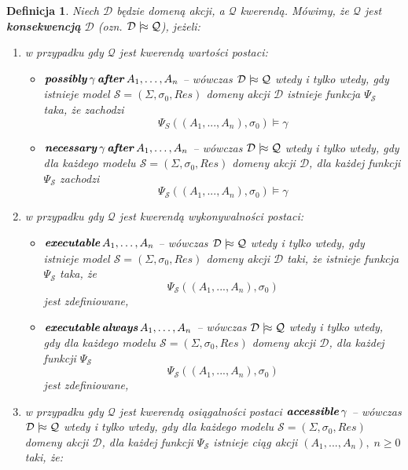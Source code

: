 \documentclass[11pt,a4paper]{article}
\newtheorem{defn}{Definicja}
\DeclareMathOperator{\After}{\textbf{\textit{after}}}
\DeclareMathOperator{\Always}{\textbf{\textit{always}}}
\DeclareMathOperator{\Executable}{\textbf{\textit{executable}}}
\DeclareMathOperator{\Accessible}{\textbf{\textit{accessible}}}
\DeclareMathOperator{\Possibly}{\textbf{\textit{possibly}}}
\DeclareMathOperator{\Necessary}{\textbf{\textit{necessary}}}
\def\consequence{\mathrel|\joinrel\approx}
\begin{document}
\begin{defn}
    Niech $\mathcal{D}$ będzie domeną akcji, a $\mathcal{Q}$ kwerendą. 
    Mówimy, że $\mathcal{Q}$ jest \textbf{konsekwencją} $\mathcal{D}$ (ozn. $\mathcal{D} \consequence \mathcal{Q}$), jeżeli:

    \begin{enumerate}
        \item w przypadku gdy $\mathcal{Q}$ jest kwerendą wartości postaci:
        \begin{itemize}
            \item $\Possibly \gamma \After A_1, \dots, A_n$ -- wówczas $\mathcal{D} \consequence \mathcal{Q}$ wtedy i tylko wtedy, gdy istnieje model %
            $\mathcal{S} = (\Sigma,\sigma_0,Res)$ domeny akcji $\mathcal{D}$ istnieje funkcja $\Psi_\mathcal{S}$ taka, że zachodzi $$\Psi_S((A_1,...,A_n),\sigma_{0}) \models \gamma$$
            \item $\Necessary \gamma \After A_1, \dots, A_n$ -- wówczas $\mathcal{D} \consequence \mathcal{Q}$ wtedy i tylko wtedy, gdy dla każdego modelu %
            $\mathcal{S} = (\Sigma,\sigma_0,Res)$ domeny akcji $\mathcal{D}$, dla każdej funkcji $\Psi_\mathcal{S}$ zachodzi $$\Psi_\mathcal{S}((A_1,...,A_n),\sigma_{0}) \models \gamma$$
        \end{itemize}
        \item w przypadku gdy $\mathcal{Q}$ jest kwerendą wykonywalności postaci:
        \begin{itemize}
            \item $\Executable A_1, \dots, A_n$ -- wówczas $\mathcal{D} \consequence \mathcal{Q}$ wtedy i tylko wtedy, gdy istnieje model %
            $\mathcal{S} = (\Sigma,\sigma_0,Res)$ domeny akcji $\mathcal{D}$ taki, że istnieje %
            funkcja $\Psi_\mathcal{S}$ taka, że
            $$\Psi_\mathcal{S}((A_1,...,A_n),\sigma_{0})$$
            jest zdefiniowane,
            \item $\Executable \Always A_1, \dots, A_n$ -- wówczas $\mathcal{D} \consequence \mathcal{Q}$ wtedy i tylko wtedy, gdy dla każdego modelu %
            $\mathcal{S} = (\Sigma,\sigma_0,Res)$ domeny akcji $\mathcal{D}$, dla każdej funkcji $\Psi_\mathcal{S}$
            $$\Psi_\mathcal{S}((A_1,...,A_n),\sigma_{0})$$
            jest zdefiniowane,
        \end{itemize}
        \item w przypadku gdy $\mathcal{Q}$ jest kwerendą osiągalności postaci $\Accessible \gamma$ -- wówczas $\mathcal{D} \consequence \mathcal{Q}$ wtedy i tylko wtedy, gdy dla każdego modelu $\mathcal{S} = (\Sigma,\sigma_0,Res)$ domeny akcji $\mathcal{D}$, dla każdej funkcji $\Psi_\mathcal{S}$ istnieje ciąg akcji $(A_1,...,A_n), \; n \geq 0$ taki, że:

\end{enumerate}
\end{defn}
\end{document}
